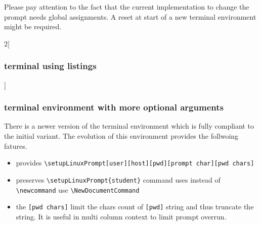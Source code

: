 \documentclass[
]{bfhpub}				%
\begin{document}
Please pay attention to the fact that the current implementation to change the prompt needs global assignments. A reset at start of a new terminal environment might be required.


\begin{multicols}{2}[\subsubsection{terminal using listings}]

\end{multicols}

\subsubsection{terminal environment with more optional arguments}
There is a newer version of the terminal environment which is fully compliant to the initial variant. The evolution of this environment provides the follwoing fatures.

\begin{itemize}
 \item provides \verb|\setupLinuxPrompt[user][host][pwd][prompt char][pwd chars]|
 \item preserves \verb|\setupLinuxPrompt{student}| command uses instead of \verb|\newcommand| use \verb|\NewDocumentCommand|
 \item the \verb|[pwd chars]| limit the chars count of \verb|[pwd]| string and thus truncate the string. It is useful in multi column context to limit prompt overrun.
\end{itemize}
\end{document}
